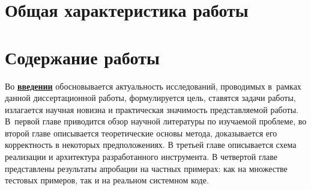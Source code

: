 
\section*{Общая характеристика работы}

\newcommand{\actuality}{\underline{\textbf{\actualityTXT}}}
\newcommand{\progress}{\underline{\textbf{\progressTXT}}}
\newcommand{\aim}{\underline{{\textbf\aimTXT}}}
\newcommand{\tasks}{\underline{\textbf{\tasksTXT}}}
\newcommand{\novelty}{\underline{\textbf{\noveltyTXT}}}
\newcommand{\influence}{\underline{\textbf{\influenceTXT}}}
\newcommand{\methods}{\underline{\textbf{\methodsTXT}}}
\newcommand{\defpositions}{\underline{\textbf{\defpositionsTXT}}}
\newcommand{\reliability}{\underline{\textbf{\reliabilityTXT}}}
\newcommand{\probation}{\underline{\textbf{\probationTXT}}}
\newcommand{\contribution}{\underline{\textbf{\contributionTXT}}}
\newcommand{\publications}{\underline{\textbf{\publicationsTXT}}}



\section*{Содержание работы}
Во \underline{\textbf{введении}} обосновывается актуальность
исследований, проводимых в~рамках данной диссертационной работы,
формулируется цель, ставятся задачи работы, излагается научная новизна
и практическая значимость представляемой работы.
В~первой главе приводится обзор научной литературы по изучаемой проблеме, во второй главе описывается теоретические основы метода, доказывается его корректность в некоторых предположениях.
В третьей главе описывается схема реализации и архитектура разработанного инструмента.
В четвертой главе представлены результаты апробации на частных примерах: как на множестве тестовых примеров, так и на реальном системном коде.

